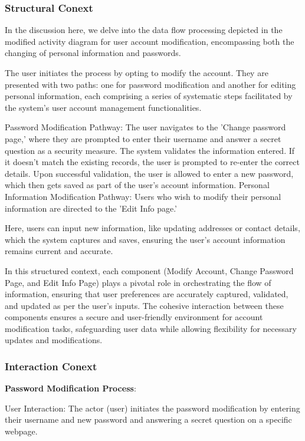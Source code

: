 \documentclass[conference]{IEEEtran}
\begin{document}
\subsubsection{\textbf{Structural Conext }}
\textbf{ }

In the discussion here, we delve into the data flow processing depicted in the modified activity diagram for user account modification, encompassing both the changing of personal information and passwords.

The user initiates the process by opting to modify the account. They are presented with two paths: one for password modification and another for editing personal information, each comprising a series of systematic steps facilitated by the system's user account management functionalities.

Password Modification Pathway:
The user navigates to the 'Change password page,' where they are prompted to enter their username and answer a secret question as a security measure.
The system validates the information entered. If it doesn't match the existing records, the user is prompted to re-enter the correct details.
Upon successful validation, the user is allowed to enter a new password, which then gets saved as part of the user's account information.
Personal Information Modification Pathway:
Users who wish to modify their personal information are directed to the 'Edit Info page.'

Here, users can input new information, like updating addresses or contact details, which the system captures and saves, ensuring the user's account information remains current and accurate.

In this structured context, each component (Modify Account, Change Password Page, and Edit Info Page) plays a pivotal role in orchestrating the flow of information, ensuring that user preferences are accurately captured, validated, and updated as per the user's inputs. The cohesive interaction between these components ensures a secure and user-friendly environment for account modification tasks, safeguarding user data while allowing flexibility for necessary updates and modifications.


\subsubsection{\textbf{Interaction Conext }}
\textbf{ }

\textbf{ Password Modification Process}:

User Interaction: The actor (user) initiates the password modification by entering their username and new password and answering a secret question on a specific webpage.
\end{document}
